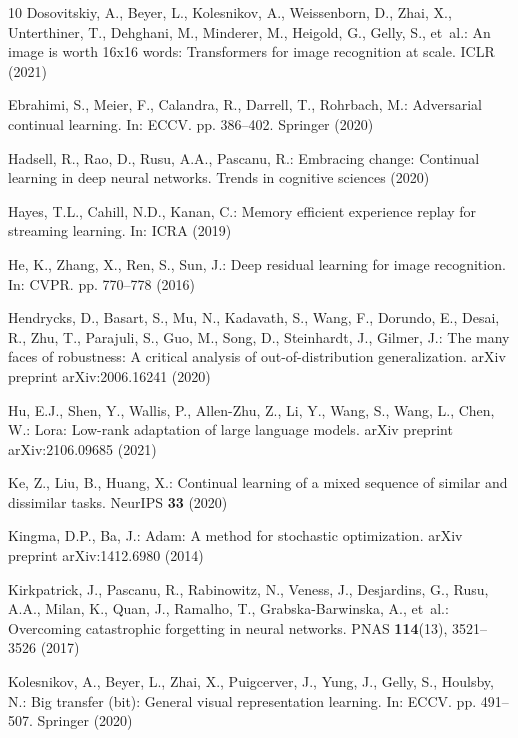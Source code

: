 \documentclass[runningheads]{llncs}
\begin{document}
\begin{thebibliography}{10}
Dosovitskiy, A., Beyer, L., Kolesnikov, A., Weissenborn, D., Zhai, X.,
  Unterthiner, T., Dehghani, M., Minderer, M., Heigold, G., Gelly, S., et~al.:
  An image is worth 16x16 words: Transformers for image recognition at scale.
  ICLR  (2021)

Ebrahimi, S., Meier, F., Calandra, R., Darrell, T., Rohrbach, M.: Adversarial
  continual learning. In: ECCV. pp. 386--402. Springer (2020)

Hadsell, R., Rao, D., Rusu, A.A., Pascanu, R.: Embracing change: Continual
  learning in deep neural networks. Trends in cognitive sciences  (2020)

Hayes, T.L., Cahill, N.D., Kanan, C.: Memory efficient experience replay for
  streaming learning. In: ICRA (2019)

He, K., Zhang, X., Ren, S., Sun, J.: Deep residual learning for image
  recognition. In: CVPR. pp. 770--778 (2016)

Hendrycks, D., Basart, S., Mu, N., Kadavath, S., Wang, F., Dorundo, E., Desai,
  R., Zhu, T., Parajuli, S., Guo, M., Song, D., Steinhardt, J., Gilmer, J.: The
  many faces of robustness: A critical analysis of out-of-distribution
  generalization. arXiv preprint arXiv:2006.16241  (2020)

Hu, E.J., Shen, Y., Wallis, P., Allen-Zhu, Z., Li, Y., Wang, S., Wang, L.,
  Chen, W.: Lora: Low-rank adaptation of large language models. arXiv preprint
  arXiv:2106.09685  (2021)

Ke, Z., Liu, B., Huang, X.: Continual learning of a mixed sequence of similar
  and dissimilar tasks. NeurIPS  \textbf{33} (2020)

Kingma, D.P., Ba, J.: Adam: A method for stochastic optimization. arXiv
  preprint arXiv:1412.6980  (2014)

Kirkpatrick, J., Pascanu, R., Rabinowitz, N., Veness, J., Desjardins, G., Rusu,
  A.A., Milan, K., Quan, J., Ramalho, T., Grabska-Barwinska, A., et~al.:
  Overcoming catastrophic forgetting in neural networks. PNAS
  \textbf{114}(13),  3521--3526 (2017)

Kolesnikov, A., Beyer, L., Zhai, X., Puigcerver, J., Yung, J., Gelly, S.,
  Houlsby, N.: Big transfer (bit): General visual representation learning. In:
  ECCV. pp. 491--507. Springer (2020)


\end{thebibliography}
\end{document}
